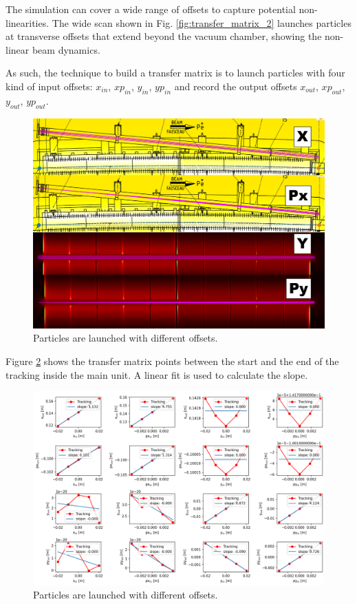 The simulation can cover a wide range of offsets to capture potential non-linearities. The wide scan shown in Fig. \ref{fig:transfer_matrix_2} launches particles at transverse offsets that extend beyond the vacuum chamber, showing the non-linear beam dynamics.

As such, the technique to build a transfer matrix is to launch particles with four kind of input offsets: $x_{in}$, $xp_{in}$, $y_{in}$, $yp_{in}$ and record the output offsets $x_{out}$, $xp_{out}$, $y_{out}$, $yp_{out}$.

\begin{figure}[H]
\centering
\includegraphics[width=1.0\textwidth]{02_Simulation/images/injection_transfer_matrix_3.png}
\caption{Particles are launched with different offsets.}
\label{fig:transfer_matrix_3}
\end{figure}

Figure \ref{fig:transfer_matrix_4} shows the transfer matrix points between the start and the end of the tracking inside the main unit. A linear fit is used to calculate the slope.

\begin{figure}[H]
\centering
\includegraphics[width=1.0\textwidth]{02_Simulation/images/injection_transfer_matrix_4.png}
\caption{Particles are launched with different offsets.}
\label{fig:transfer_matrix_4}
\end{figure}



